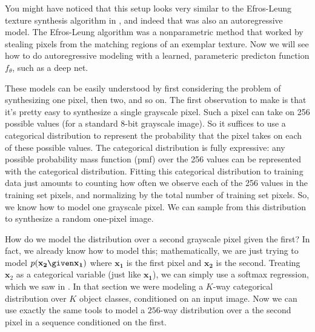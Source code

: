 You might have noticed that this setup looks very similar to the Efros-Leung texture synthesis algorithm in \sect{\ref{sect:Efros-Leung_texture}}, and indeed that was also an autoregressive model. The Efros-Leung algorithm was a nonparametric method that worked by stealing pixels from the matching regions of an exemplar texture. Now we will see how to do autoregressive modeling with a learned, parameteric predicton function $f_{\theta}$, such as a deep net.

These models can be easily understood by first considering the problem of synthesizing one pixel, then two, and so on. The first observation to make is that it's pretty easy to synthesize a single grayscale pixel. Such a pixel can take on 256 possible values (for a standard 8-bit grayscale image). So it suffices to use a categorical distribution to represent the probability that the pixel takes on each of these possible values. The categorical distribution is fully expressive: any possible probability mass function (pmf) over the 256 values can be represented with the categorical distribution. Fitting this categorical distribution to training data just amounts to counting how often we observe each of the 256 values in the training set pixels, and normalizing by the total number of training set pixels. So, we know how to model one grayscale pixel. We can sample from this distribution to synthesize a random one-pixel image. %

How do we model the distribution over a second grayscale pixel given the first? In fact, we already know how to model this; mathematically, we are just trying to model $p(\mathbf{x_2} \given \mathbf{x_1})$ where $\mathbf{x_1}$ is the first pixel and $\mathbf{x_2}$ is the second. Treating $\mathbf{x}_2$ as a categorical variable (just like $\mathbf{x_1}$), we can simply use a softmax regression, which we saw in \sect{\ref{sec:intro_to_learning:image_classification}}. In that section we were modeling a $K$-way categorical distribution over $K$ object classes, conditioned on an input image. Now we can use exactly the same tools to model a $256$-way distribution over a the second pixel in a sequence conditioned on the first.

